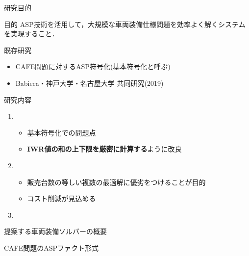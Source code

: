 \documentclass[dvipdfmx, 11pt,]{beamer}
\begin{document}
\begin{frame}{研究目的}
  \begin{alertblock}{目的}
    ASP技術を活用して，大規模な車両装備仕様問題を効率よく解くシステム
    を実現すること．
  \end{alertblock}
  \begin{block}{既存研究}
   \begin{itemize}
    \item CAFE問題に対するASP符号化(基本符号化と呼ぶ)
    \item Babieca・神戸大学・名古屋大学 共同研究(2019)
   \end{itemize}
  \end{block}
  \begin{block}{研究内容}
    \begin{enumerate}
     \item {}
	   \begin{itemize}
	    \item 基本符号化での問題点
	    \item \alert{\bf IWR値の和の上下限を厳密に計算する}ように改良
	   \end{itemize}
     \item {}
	   \begin{itemize}
	    \item 販売台数の等しい複数の最適解に優劣をつけることが目的
	    \item コスト削減が見込める
	   \end{itemize}
	   
     \item {}
    \end{enumerate}
  \end{block}
\end{frame}
\begin{frame}{提案する車両装備ソルバーの概要}
 
\end{frame}
\begin{frame}[fragile]{CAFE問題のASPファクト形式}
 \begin{multicols}{2}
   
 \end{multicols}
\end{frame}
\end{document}
